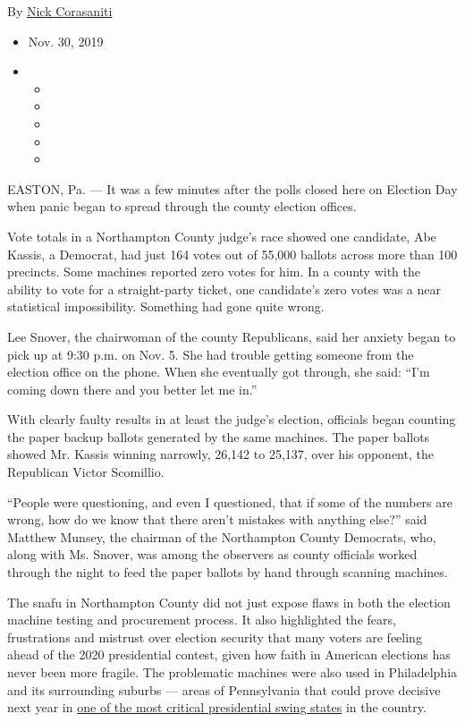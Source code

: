 By \href{https://www.nytimes3xbfgragh.onion/by/nick-corasaniti}{Nick
Corasaniti}

\begin{itemize}
\item
  Nov. 30, 2019
\item
  \begin{itemize}
  \item
  \item
  \item
  \item
  \item
  \end{itemize}
\end{itemize}

EASTON, Pa. --- It was a few minutes after the polls closed here on
Election Day when panic began to spread through the county election
offices.

Vote totals in a Northampton County judge's race showed one candidate,
Abe Kassis, a Democrat, had just 164 votes out of 55,000 ballots across
more than 100 precincts. Some machines reported zero votes for him. In a
county with the ability to vote for a straight-party ticket, one
candidate's zero votes was a near statistical impossibility. Something
had gone quite wrong.

Lee Snover, the chairwoman of the county Republicans, said her anxiety
began to pick up at 9:30 p.m. on Nov. 5. She had trouble getting someone
from the election office on the phone. When she eventually got through,
she said: ``I'm coming down there and you better let me in.''

With clearly faulty results in at least the judge's election, officials
began counting the paper backup ballots generated by the same machines.
The paper ballots showed Mr. Kassis winning narrowly, 26,142 to 25,137,
over his opponent, the Republican Victor Scomillio.

``People were questioning, and even I questioned, that if some of the
numbers are wrong, how do we know that there aren't mistakes with
anything else?'' said Matthew Munsey, the chairman of the Northampton
County Democrats, who, along with Ms. Snover, was among the observers as
county officials worked through the night to feed the paper ballots by
hand through scanning machines.

The snafu in Northampton County did not just expose flaws in both the
election machine testing and procurement process. It also highlighted
the fears, frustrations and mistrust over election security that many
voters are feeling ahead of the 2020 presidential contest, given how
faith in American elections has never been more fragile. The problematic
machines were also used in Philadelphia and its surrounding suburbs ---
areas of Pennsylvania that could prove decisive next year in
\href{https://www.nytimes3xbfgragh.onion/2019/11/26/upshot/democratic-trump-voters-2020.html}{one
of the most critical presidential swing states} in the country.

